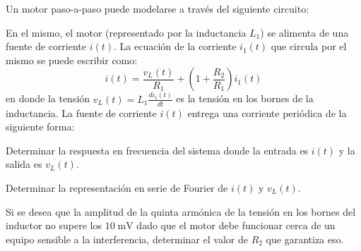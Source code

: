 \begin{ejercicio}
    Un motor paso-a-paso puede modelarse a través del siguiente circuito:
    \begin{center}
        \parbox{0.5\textwidth}{
            
        }
    \end{center}
    En el mismo, el motor (representado por la inductancia $L_1$) se alimenta de una fuente de corriente $i(t)$. La ecuación de la corriente $i_1(t)$ que circula por el mismo se puede escribir como:
    \begin{equation*}
        i(t) = \frac{v_L(t)}{R_1} + \left(1 + \frac{R_2}{R_1}\right) i_1(t)
    \end{equation*}
    en donde la tensión $v_L(t) = L_1 \frac{d i_1(t)}{dt}$ es la tensión en los bornes de la inductancia. La fuente de corriente $i(t)$ entrega una corriente periódica de la siguiente forma:
    \begin{center}
        \parbox{0.5\textwidth}{
            
        }
    \end{center}
    \inciso Determinar la respuesta en frecuencia del sistema donde la entrada es $i(t)$ y la salida es $v_L(t)$.

    \inciso Determinar la representación en serie de Fourier de $i(t)$ y $v_L(t)$.

    \inciso Si se desea que la amplitud de la quinta armónica de la tensión en los bornes del inductor no supere los $10\;\mathrm{mV}$ dado que el motor debe funcionar cerca de un equipo sensible a la interferencia, determinar el valor de $R_2$ que garantiza eso. 
\end{ejercicio}
